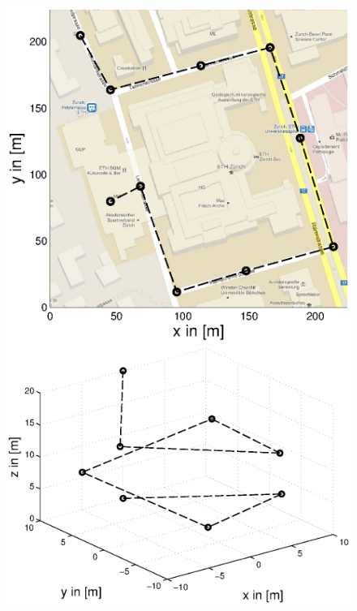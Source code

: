 \begin{figure}[h]
  \begin{minipage}[t]{0.32\textwidth}
    \includegraphics[width = \textwidth]{graphics/sampleNodeRoad}
  \end{minipage}
  \hfill
  \begin{minipage}[t]{0.32\textwidth}
    \includegraphics[width = \textwidth]{graphics/sampleNodeHelix}
  \end{minipage}
  \hfill
  \begin{minipage}[t]{0.32\textwidth}

\end{minipage}
\end{figure}
